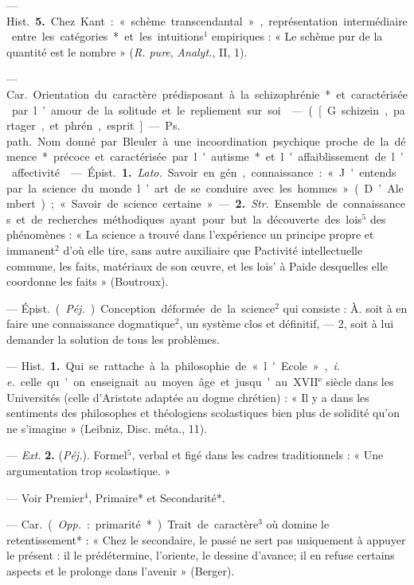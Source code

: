 \begin{itemize}[leftmargin=1cm, label=, itemsep=1pt]
— \si{Hist.} {\bf 5.} Chez Kant : « schème
transcendantal », représentation intermédiaire entre les catégories* et
les intuitions$^1$ empiriques : « Le
schème pur de la quantité est le
nombre » ({\it R. pure}, {\it Analyt.}, II, 1).

 — \si{Car.} Orientation du
caractère prédisposant à la schizophrénie* et caractérisée par l’amour
de la solitude et le repliement sur soi.

 — ([G. schizein, partager,
et phrén, esprit] — \si{Ps. path.} Nom
donné par Bleuler à une incoordination psychique proche de la démence* précoce et caractérisée par
l'autisme* et l'affaiblissement de
l’affectivité.

 — \si{Épist.} {\bf 1.} {\it Lato.} Savoir en
gén., connaissance : « J'entends par
la science du monde l’art de se conduire avec les hommes » (D’Alembert) ; « Savoir de science certaine... ».
— {\bf 2.} {\it Str.} Ensemble de connaissances et de recherches méthodiques ayant pour but la découverte des lois$^5$ des phénomènes : « La
science a trouvé dans l’expérience
un principe propre et immanent$^2$
d’où elle tire, sans autre auxiliaire
que Pactivité intellectuelle commune, les faits, matériaux de son
œuvre, et les lois’ à Paide desquelles
elle coordonne les faits » (Boutroux).

 — \si{Épist.} ({\it Péj.}) Conception déformée de la science$^2$ qui
consiste : À. soit à en faire une connaissance dogmatique$^2$, un système
clos et définitif, — 2, soit à lui
demander la solution de tous les
problèmes.

 — \si{Hist.} {\bf 1.} Qui se rattache
à la philosophie de « l'Ecole », {\it i. e.}
celle qu'on enseignait au moyen
âge et jusqu'au {\footnotesize XVII}$^\text{e}$ siècle dans les
Universités (celle d’Aristote adaptée
au dogme chrétien) : « Il y a dans
les sentiments des philosophes et
théologiens scolastiques bien plus de
solidité qu'on ne s'imagine » (Leibniz, Disc. méta., 11).

— {\it Ext.} {\bf 2.} ({\it Péj.}). Formel$^5$, verbal
et figé dans les cadres traditionnels :
« Une argumentation trop scolastique. »

 — Voir Premier$^4$,
Primaire* et Secondarité*.

 — \si{Car.} ({\it Opp.} : primarité*). Trait de caractère$^3$ où domine
le retentissement* : « Chez le secondaire, le passé ne sert pas uniquement à appuyer le présent : il le
prédétermine, l’oriente, le dessine
d'avance; il en refuse certains
aspects et le prolonge dans l’avenir »
(Berger).


\end{itemize}
